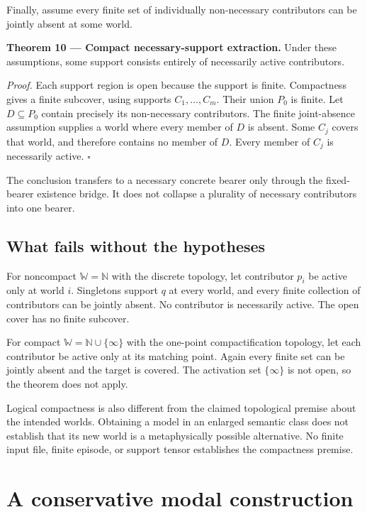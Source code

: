 \documentclass[11pt,a4paper]{article}
\begin{document}
Finally, assume every finite set of individually non-necessary
contributors can be jointly absent at some world.


\textbf{Theorem 10 --- Compact necessary-support extraction.} Under
these assumptions, some support consists entirely of necessarily active
contributors.

\emph{Proof.} Each support region is open because the support is finite.
Compactness gives a finite subcover, using supports \(C_1,\ldots,C_m\).
Their union \(P_0\) is finite. Let \(D\subseteq P_0\) contain precisely
its non-necessary contributors. The finite joint-absence assumption
supplies a world where every member of \(D\) is absent. Some \(C_j\)
covers that world, and therefore contains no member of \(D\). Every
member of \(C_j\) is necessarily active. \(\square\)

The conclusion transfers to a necessary concrete bearer only through the
fixed-bearer existence bridge. It does not collapse a plurality of
necessary contributors into one bearer.

\subsection{What fails without the
hypotheses}\label{what-fails-without-the-hypotheses}

For noncompact \(\mathbb W=\mathbb N\) with the discrete topology, let
contributor \(p_i\) be active only at world \(i\). Singletons support
\(q\) at every world, and every finite collection of contributors can be
jointly absent. No contributor is necessarily active. The open cover has
no finite subcover.

For compact \(\mathbb W=\mathbb N\cup\{\infty\}\) with the one-point
compactification topology, let each contributor be active only at its
matching point. Again every finite set can be jointly absent and the
target is covered. The activation set \(\{\infty\}\) is not open, so the
theorem does not apply.

Logical compactness is also different from the claimed topological
premise about the intended worlds. Obtaining a model in an enlarged
semantic class does not establish that its new world is a metaphysically
possible alternative. No finite input file, finite episode, or support
tensor establishes the compactness premise.

\section{A conservative modal
construction}\label{a-conservative-modal-construction}
\end{document}
